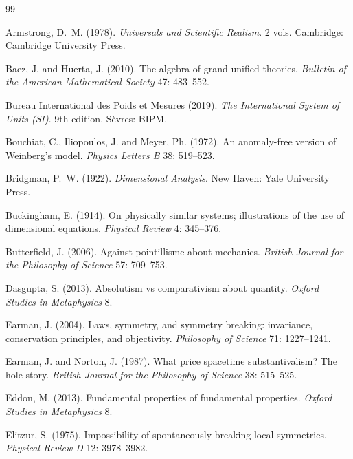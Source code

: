 \documentclass{situationist-preprint}
\begin{document}
\begin{thebibliography}{99}

Armstrong, D.~M. (1978). \emph{Universals and Scientific Realism}. 2 vols. Cambridge: Cambridge University Press.

Baez, J. and Huerta, J. (2010). The algebra of grand unified theories. \emph{Bulletin of the American Mathematical Society} 47: 483--552.

Bureau International des Poids et Mesures (2019). \emph{The International System of Units (SI)}. 9th edition. S\`evres: BIPM.

Bouchiat, C., Iliopoulos, J. and Meyer, Ph. (1972). An anomaly-free version of Weinberg's model. \emph{Physics Letters B} 38: 519--523.

Bridgman, P.~W. (1922). \emph{Dimensional Analysis}. New Haven: Yale University Press.

Buckingham, E. (1914). On physically similar systems; illustrations of the use of dimensional equations. \emph{Physical Review} 4: 345--376.

Butterfield, J. (2006). Against pointillisme about mechanics. \emph{British Journal for the Philosophy of Science} 57: 709--753.

Dasgupta, S. (2013). Absolutism vs comparativism about quantity. \emph{Oxford Studies in Metaphysics} 8.

Earman, J. (2004). Laws, symmetry, and symmetry breaking: invariance, conservation principles, and objectivity. \emph{Philosophy of Science} 71: 1227--1241.

Earman, J. and Norton, J. (1987). What price spacetime substantivalism? The hole story. \emph{British Journal for the Philosophy of Science} 38: 515--525.

Eddon, M. (2013). Fundamental properties of fundamental properties. \emph{Oxford Studies in Metaphysics} 8.

Elitzur, S. (1975). Impossibility of spontaneously breaking local symmetries. \emph{Physical Review D} 12: 3978--3982.


\end{thebibliography}
\end{document}
